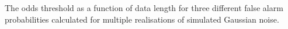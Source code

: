\label{fig:changepoint}
The odds threshold as a function of data length for three different false alarm probabilities calculated for
multiple realisations of simulated Gaussian noise. 
